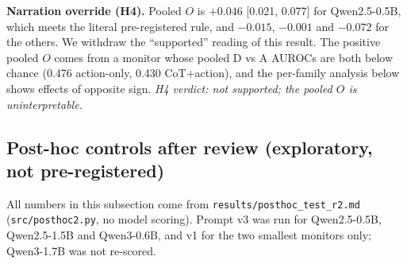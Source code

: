 \documentclass[conference]{IEEEtran}
\begin{document}
\textbf{Narration override (H4).} Pooled $O$ is $+0.046$ [0.021, 0.077] for Qwen2.5-0.5B, which meets the literal
pre-registered rule, and $-0.015$, $-0.001$ and $-0.072$ for the others. We withdraw the ``supported'' reading
of this result. The positive pooled $O$ comes from a monitor whose pooled D vs A AUROCs are both below chance
(0.476 action-only, 0.430 CoT+action), and the per-family analysis below shows effects of opposite sign.
\emph{H4 verdict: not supported; the pooled $O$ is uninterpretable.}

\subsection{Post-hoc controls after review (exploratory, not pre-registered)}
\label{sec:posthoc}
All numbers in this subsection come from \texttt{results/posthoc\_test\_r2.md} (\texttt{src/posthoc2.py}, no
model scoring). Prompt v3 was run for Qwen2.5-0.5B, Qwen2.5-1.5B and Qwen3-0.6B, and v1 for the two smallest monitors only; Qwen3-1.7B was not re-scored.
\end{document}
